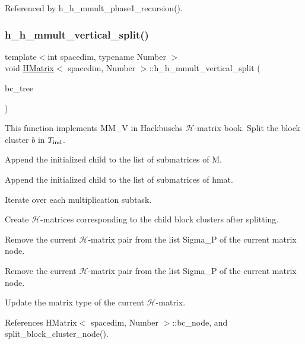 Referenced by h\+\_\+h\+\_\+mmult\+\_\+phase1\+\_\+recursion().

\mbox{\label{classHMatrix_a253c23d09e89a9a37a7d808374b5ae4e}} 
\subsubsection{\texorpdfstring{h\+\_\+h\+\_\+mmult\+\_\+vertical\+\_\+split()}{h\_h\_mmult\_vertical\_split()}}
{\footnotesize\ttfamily template$<$int spacedim, typename Number $>$ \\
void \hyperlink{classHMatrix}{H\+Matrix}$<$ spacedim, Number $>$\+::h\+\_\+h\+\_\+mmult\+\_\+vertical\+\_\+split (\begin{DoxyParamCaption}\item[{\hyperlink{classBlockClusterTree}{Block\+Cluster\+Tree}$<$ spacedim, Number $>$ \&}]{bc\+\_\+tree }\end{DoxyParamCaption})}

This function implements {\ttfamily M\+M\+\_\+V} in Hackbusch\textquotesingle{}s $\mathcal{H}$-\/matrix book. Split the block cluster $b$ in $T_{\rm ind}$.

Append the initialized child to the list of submatrices of {\ttfamily M}.

Append the initialized child to the list of submatrices of {\ttfamily hmat}.

Iterate over each multiplication subtask.

Create $\mathcal{H}$-\/matrices corresponding to the child block clusters after splitting.

Remove the current $\mathcal{H}$-\/matrix pair from the list {\ttfamily Sigma\+\_\+P} of the current matrix node.

Remove the current $\mathcal{H}$-\/matrix pair from the list {\ttfamily Sigma\+\_\+P} of the current matrix node.

Update the matrix type of the current $\mathcal{H}$-\/matrix.

References H\+Matrix$<$ spacedim, Number $>$\+::bc\+\_\+node, and split\+\_\+block\+\_\+cluster\+\_\+node().

\mbox{\label{classHMatrix_af972cb62d436b8dca5d95a5b6e2ed964}} 

